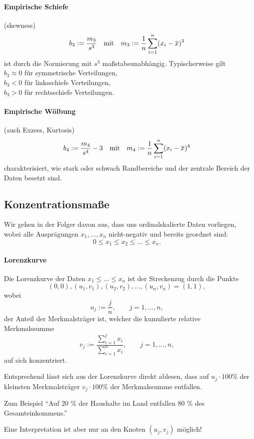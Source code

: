 \paragraph{Empirische Schiefe}
(skewness)
\[ b_3 := \frac{m_3}{s^3} \quad \text{mit} \quad m_3 := \rez{n} \sum_{i=1}^n
  (x_i - \obar{x})^3 \]
ist durch die Normierung mit $s^3$ maßstabsunabhängig. Typischerweise gilt \\
$b_3 \approx 0$ für symmetrische Verteilungen, \\
$b_3 < 0$ für linksschiefe Verteilungen, \\
$b_3 > 0$ für rechtsschiefe Verteilungen.

\paragraph{Empirische Wölbung}
(auch Exzess, Kurtosis)
\[ b_4 := \frac{m_4}{s^4} - 3 \quad \text{mit} \quad m_4 := \rez{n} \sum_{i=1}^n
  (x_i - \obar{x})^4 \]
charakterisiert, wie stark oder schwach Randbereiche und der zentrale Bereich
der Daten besetzt sind.

\subsection{Konzentrationsmaße}
Wir gehen in der Folger davon aus, dass uns ordinalskalierte Daten vorliegen,
wobei alle Ausprägungen $x_1, \ldots, x_n$ nicht-negativ und bereits geordnet
sind:
\[ 0 \le x_1 \le x_2 \le \ldots \le x_n. \]

\paragraph{Lorenzkurve}
Die Lorenzkurve der Daten $x_1 \le \ldots \le x_n$ ist der Streckenzug durch die
Punkte
\[ (0,0), (u_1, v_1), (u_2, v_2), \ldots, (u_n, v_n) = (1,1), \]
wobei
\[ u_j := \frac{j}{n}, \qquad j = 1, \ldots, n, \]
der Anteil der Merkmalsträger ist, welcher die kumulierte relative
Merkmalssumme
\[ v_j := \frac{ \sum_{i=1}^j x_i }{ \sum_{i=1}^n x_i}, \qquad j = 1, \ldots,
  n, \]
auf sich konzentriert.

Entsprechend lässt sich aus der Lorenzkurve direkt ablesen, dass auf $u_j \cdot
100 \%$ der kleinsten Merkmalsträger $v_j \cdot 100 \%$ der Merkmalssumme
entfallen.

Zum Beispiel ``Auf 20 \% der Haushalte im Land entfallen 80 \% des
Gesamteinkommens.''

Eine Interpretation ist aber nur an den Knoten $(u_j, v_j)$ möglich!

